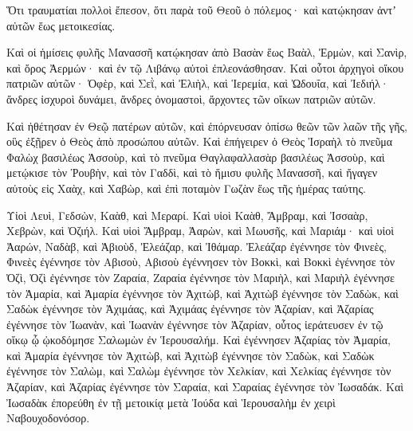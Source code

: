 {Ὅτι τραυματίαι πολλοὶ ἔπεσον, ὅτι παρὰ τοῦ Θεοῦ ὁ πόλεμος· καὶ κατῴκησαν ἀντʼ αὐτῶν ἕως μετοικεσίας.
\par }{\PP {}Καὶ οἱ ἡμίσεις φυλῆς Μανασσῆ κατῴκησαν ἀπὸ Βασὰν ἕως Βαὰλ, Ἐρμὼν, καὶ Σανὶρ, καὶ ὄρος Ἀερμών· καὶ ἐν τῷ Λιβάνῳ αὐτοὶ ἐπλεονάσθησαν.
Καὶ οὗτοι ἀρχηγοὶ οἴκου πατριῶν αὐτῶν· Ὀφὲρ, καὶ Σεῒ, καὶ Ἐλιὴλ, καὶ Ἱερεμία, καὶ Ὠδουΐα, καὶ Ἰεδιήλ· ἄνδρες ἰσχυροὶ δυνάμει, ἄνδρες ὀνομαστοὶ, ἄρχοντες τῶν οἴκων πατριῶν αὐτῶν.
\par }{\PP {}Καὶ ἠθέτησαν ἐν Θεῷ πατέρων αὐτῶν, καὶ ἐπόρνευσαν ὀπίσω θεῶν τῶν λαῶν τῆς γῆς, οὓς ἐξῇρεν ὁ Θεὸς ἀπὸ προσώπου αὐτῶν.
Καὶ ἐπήγειρεν ὁ Θεὸς Ἰσραὴλ τὸ πνεῦμα Φαλὼχ βασιλέως Ἀσσοὺρ, καὶ τὸ πνεῦμα Θαγλαφαλλασὰρ βασιλέως Ἀσσοὺρ, καὶ μετῴκισε τὸν Ῥουβὴν, καὶ τὸν Γαδδὶ, καὶ τὸ ἥμισυ φυλῆς Μανασσῆ, καὶ ἤγαγεν αὐτοὺς εἰς Χαὰχ, καὶ Χαβὼρ, καὶ ἐπὶ ποταμὸν Γωζὰν ἕως τῆς ἡμέρας ταύτης.
\par }{\PP {}Υἱοὶ Λευὶ, Γεδσὼν, Καὰθ, καὶ Μεραρί.
Καὶ υἱοὶ Καὰθ, Ἄμβραμ, καὶ Ἰσσαὰρ, Χεβρὼν, καὶ Ὀζιήλ.
Καὶ υἱοὶ Ἄμβραμ, Ἀαρὼν, καὶ Μωυσῆς, καὶ Μαριάμ· καὶ υἱοὶ Ἀαρών, Ναδὰβ, καὶ Ἀβιοὺδ, Ἐλεάζαρ, καὶ Ἰθάμαρ.
Ἐλεάζαρ ἐγέννησε τὸν Φινεὲς, Φινεὲς ἐγέννησε τὸν Αβισοὺ,
Αβισοὺ ἐγέννησεν τὸν Βοκκὶ, καὶ Βοκκὶ ἐγέννησε τὸν Ὀζὶ,
Ὀζὶ ἐγέννησε τὸν Ζαραία, Ζαραία ἐγέννησε τὸν Μαριὴλ,
καὶ Μαριὴλ ἐγέννησε τὸν Ἀμαρία, καὶ Ἀμαρία ἐγέννησε τὸν Ἀχιτὼβ,
καὶ Ἀχιτὼβ ἐγέννησε τὸν Σαδὼκ, καὶ Σαδὼκ ἐγέννησε τὸν Ἀχιμάας,
καὶ Ἀχιμάας ἐγέννησε τὸν Ἀζαρίαν, καὶ Ἀζαρίας ἐγέννησε τὸν Ἰωανὰν,
καὶ Ἰωανὰν ἐγέννησε τὸν Ἀζαρίαν, οὗτος ἱεράτευσεν ἐν τῷ οἴκῳ ᾧ ᾠκοδόμησε Σαλωμὼν ἐν Ἱερουσαλήμ.
Καὶ ἐγέννησεν Ἀζαρίας τὸν Ἀμαρία, καὶ Ἀμαρία ἐγέννησε τὸν Ἀχιτὼβ,
καὶ Ἀχιτὼβ ἐγέννησε τὸν Σαδὼκ, καὶ Σαδὼκ ἐγέννησε τὸν Σαλὼμ,
καὶ Σαλὼμ ἐγέννησε τὸν Χελκίαν, καὶ Χελκίας ἐγέννησε τὸν Ἀζαρίαν,
καὶ Ἀζαρίας ἐγέννησε τὸν Σαραία, καὶ Σαραίας ἐγέννησε τὸν Ἰωσαδάκ.
Καὶ Ἰωσαδὰκ ἐπορεύθη ἐν τῇ μετοικίᾳ μετὰ Ἰούδα καὶ Ἱερουσαλὴμ ἐν χειρὶ Ναβουχοδονόσορ.

}

